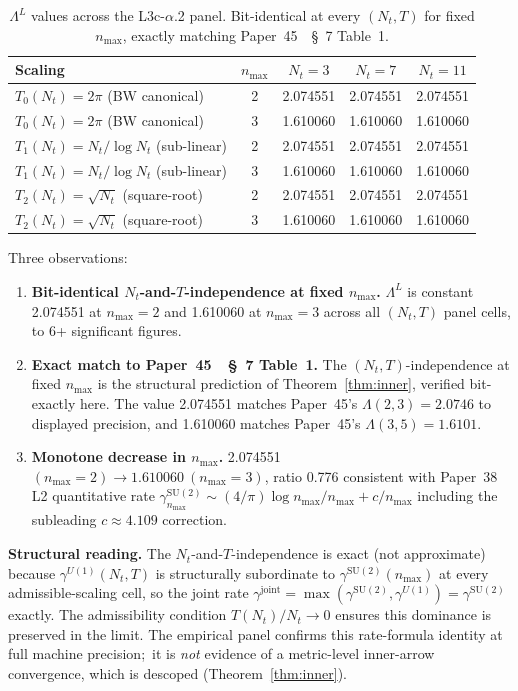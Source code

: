 \documentclass[11pt,a4paper]{article}
\theoremstyle{plain}
\theoremstyle{definition}
\newcommand{\nmax}{n_{\max}}
\newcommand{\Nt}{N_{t}}
\newcommand{\SU}{\mathrm{SU}}
\newcommand{\Lprop}{\Lambda^{L}}
\newcommand{\gammajoint}{\gamma^{\mathrm{joint}}}
\begin{document}
\begin{table}[h]
\centering
\begin{tabular}{lcccc}
\toprule
Scaling & $\nmax$ & $\Nt = 3$ & $\Nt = 7$ & $\Nt = 11$ \\
\midrule
$T_{0}(\Nt) = 2\pi$ (BW canonical) & 2 & 2.074551 & 2.074551 & 2.074551 \\
$T_{0}(\Nt) = 2\pi$ (BW canonical) & 3 & 1.610060 & 1.610060 & 1.610060 \\
$T_{1}(\Nt) = \Nt/\log\Nt$ (sub-linear) & 2 & 2.074551 & 2.074551 & 2.074551 \\
$T_{1}(\Nt) = \Nt/\log\Nt$ (sub-linear) & 3 & 1.610060 & 1.610060 & 1.610060 \\
$T_{2}(\Nt) = \sqrt{\Nt}$ (square-root) & 2 & 2.074551 & 2.074551 & 2.074551 \\
$T_{2}(\Nt) = \sqrt{\Nt}$ (square-root) & 3 & 1.610060 & 1.610060 & 1.610060 \\
\bottomrule
\end{tabular}
\caption{$\Lprop$ values across the L3c-$\alpha$.2 panel. Bit-identical at
every $(\Nt, T)$ for fixed $\nmax$, exactly matching
Paper~45~\cite{paper45}~\S~7 Table~1.}
\label{tab:l3c_alpha_2_panel}
\end{table}

\noindent Three observations:
\begin{enumerate}
\item \textbf{Bit-identical $\Nt$-and-$T$-independence at fixed
$\nmax$.} $\Lprop$ is constant 2.074551 at $\nmax = 2$ and 1.610060 at
$\nmax = 3$ across all $(\Nt, T)$ panel cells, to 6+ significant
figures.

\item \textbf{Exact match to Paper~45~\cite{paper45}~\S~7 Table~1.}
The $(\Nt, T)$-independence at fixed $\nmax$ is the structural
prediction of Theorem~\ref{thm:inner}, verified bit-exactly here. The
value 2.074551 matches Paper~45's $\Lambda(2, 3) = 2.0746$ to
displayed precision, and 1.610060 matches Paper~45's
$\Lambda(3, 5) = 1.6101$.

\item \textbf{Monotone decrease in $\nmax$.} 2.074551
$(\nmax=2) \to 1.610060\ (\nmax=3)$, ratio 0.776 consistent with
Paper~38~\cite{paper38} L2 quantitative rate
$\gamma^{\SU(2)}_{\nmax} \sim (4/\pi) \log\nmax/\nmax + c/\nmax$
including the subleading $c \approx 4.109$ correction.
\end{enumerate}

\textbf{Structural reading.} The $\Nt$-and-$T$-independence is exact
(not approximate) because $\gamma^{U(1)}(\Nt, T)$ is structurally
subordinate to $\gamma^{\SU(2)}(\nmax)$ at every admissible-scaling
cell, so the joint rate
$\gammajoint = \max(\gamma^{\SU(2)}, \gamma^{U(1)}) =
\gamma^{\SU(2)}$ exactly. The admissibility condition
$T(\Nt)/\Nt \to 0$ ensures this dominance is preserved in the limit.
The empirical panel confirms this rate-formula identity at full machine
precision;\ it is \emph{not} evidence of a metric-level inner-arrow
convergence, which is descoped (Theorem~\ref{thm:inner}).
\end{document}
